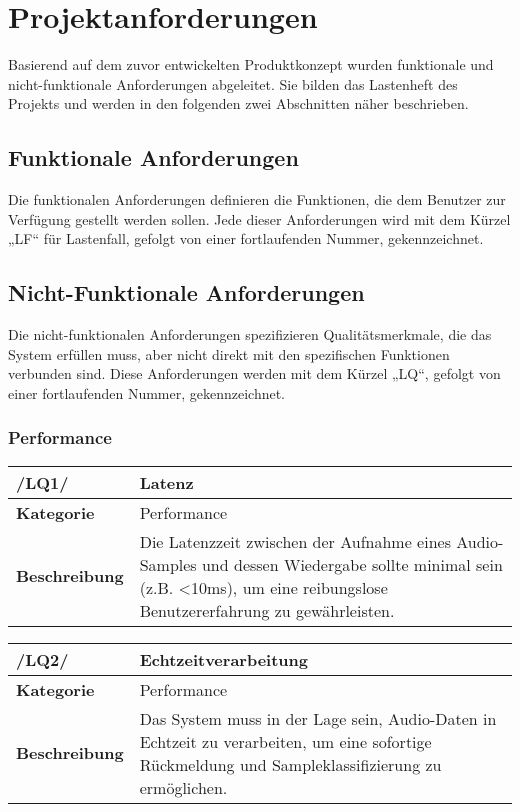 \newpage
\section{Projektanforderungen}

Basierend auf dem zuvor entwickelten Produktkonzept wurden funktionale und nicht-funktionale Anforderungen abgeleitet. Sie bilden das Lastenheft des Projekts und werden in den folgenden zwei Abschnitten näher beschrieben.

\subsection{Funktionale Anforderungen}
Die funktionalen Anforderungen definieren die Funktionen, die dem Benutzer zur Verfügung gestellt werden sollen. Jede dieser Anforderungen wird mit dem Kürzel „LF“ für Lastenfall, gefolgt von einer fortlaufenden Nummer, gekennzeichnet.



\newpage

\subsection{Nicht-Funktionale Anforderungen}
Die nicht-funktionalen Anforderungen spezifizieren Qualitätsmerkmale, die das System erfüllen muss, aber nicht direkt mit den spezifischen Funktionen verbunden sind. Diese Anforderungen werden mit dem Kürzel „LQ“, gefolgt von einer fortlaufenden Nummer, gekennzeichnet.


\subsubsection{Performance}

\begin{table}[h!]
	\begin{tabularx}{\textwidth}{|l|X|}
		\hline
		\textbf{/LQ1/} & \textbf{Latenz} \\ \hline
		\textbf{Kategorie} & Performance \\ \hline
		\textbf{Beschreibung} & Die Latenzzeit zwischen der Aufnahme eines Audio-Samples und dessen Wiedergabe sollte minimal sein (z.B. <10ms), um eine reibungslose Benutzererfahrung zu gewährleisten. \\ \hline
	\end{tabularx}
\end{table}

\begin{table}[h!]
	\begin{tabularx}{\textwidth}{|l|X|}
		\hline
		\textbf{/LQ2/} & \textbf{Echtzeitverarbeitung} \\ \hline
		\textbf{Kategorie} & Performance \\ \hline
		\textbf{Beschreibung} & Das System muss in der Lage sein, Audio-Daten in Echtzeit zu verarbeiten, um eine sofortige Rückmeldung und Sampleklassifizierung zu ermöglichen. \\ \hline
	\end{tabularx}
\end{table}

